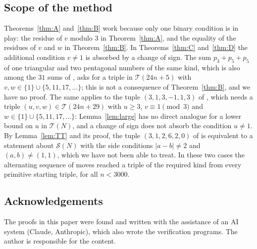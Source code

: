 \documentclass[11pt]{amsart}
\theoremstyle{definition}
\theoremstyle{remark}
\newcommand{\cS}{\mathcal{S}}
\newcommand{\cT}{\mathcal{T}}
\begin{document}
\subsection*{Scope of the method}
Theorems~\ref{thm:A} and~\ref{thm:B} work because only one binary condition is in play:
the residue of $v$ modulo $3$ in Theorem~\ref{thm:A}, and the equality of the residues of $v$ and $w$ in Theorem~\ref{thm:B}.
In Theorems~\ref{thm:C} and~\ref{thm:D} the additional condition $v\ne 1$ is absorbed by a change of sign.
The sum $p_3+p_5+p_5$ of one triangular and two pentagonal numbers of the same kind, which is also among the $31$ sums of
\cite[Conjecture~1.10]{S15}, asks for a triple in $\cT(24n+5)$ with $v,w\in\{1\}\cup\{5,11,17,\dots\}$;
this is not a consequence of Theorem~\ref{thm:B}, and we have no proof.
The same applies to the tuple $(3,1,3,-1,1,3)$ of \cite{S20}, which needs a triple $(u,v,w)\in\cT(24n+29)$ with $u\ge 3$, $v\equiv 1\pmod 3$ and $w\in\{1\}\cup\{5,11,17,\dots\}$:
Lemma~\ref{lem:large} has no direct analogue for a lower bound on $u$ in $\cT(N)$, and a change of sign does not absorb the condition $u\ne 1$.
By Lemma~\ref{lem:TT} and its proof, the tuple $(3,1,2,6,2,0)$ of \cite{S20} is equivalent to a statement about $\cS(N)$
with the side conditions $|a-b|\ne 2$ and $(a,b)\ne(1,1)$, which we have not been able to treat. In these two cases the alternating sequence of moves reached a triple of the required kind
from every primitive starting triple, for all $n<3000$.

\subsection*{Acknowledgements}
The proofs in this paper were found and written with the assistance of an AI system (Claude, Anthropic),
which also wrote the verification programs. The author is responsible for the content.
\end{document}
